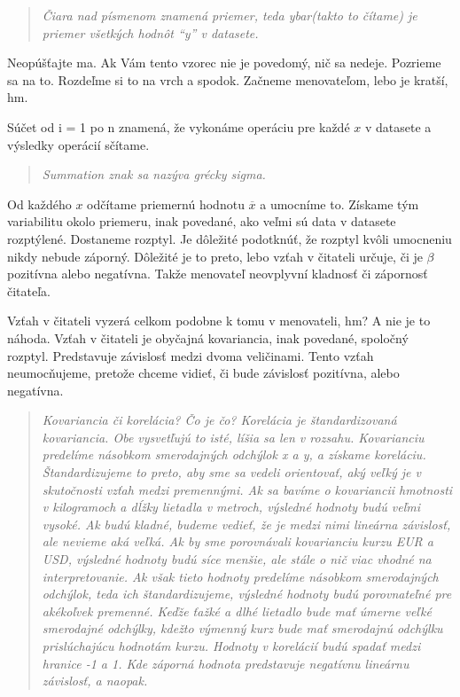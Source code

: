 \begin{quote}
\emph{Čiara nad písmenom znamená priemer, teda ybar(takto to čítame) je
priemer všetkých hodnôt ``y'' v datasete.}
\end{quote}

Neopúšťajte ma. Ak Vám tento vzorec nie je povedomý, nič sa nedeje.
Pozrieme sa na to. Rozdeľme si to na vrch a spodok. Začneme menovateľom,
lebo je kratší, hm.

Súčet od i = 1 po n znamená, že vykonáme operáciu pre každé \(x\) v
datasete a výsledky operácií sčítame.


\begin{quote}
\begin{center}
\emph{Summation znak sa nazýva grécky sigma.}
\end{center}
\end{quote}


Od každého \(x\) odčítame priemernú hodnotu \(\overline{x}\) a umocníme
to. Získame tým variabilitu okolo priemeru, inak povedané, ako veľmi sú
data v datasete rozptýlené. Dostaneme rozptyl. Je dôležité podotknúť, že
rozptyl kvôli umocneniu nikdy nebude záporný. Dôležité je to preto, lebo
vzťah v čitateli určuje, či je \(\beta\) pozitívna alebo negatívna.
Takže menovateľ neovplyvní kladnosť či zápornosť čitateľa.

Vzťah v čitateli vyzerá celkom podobne k tomu v menovateli, hm? A nie je
to náhoda. Vzťah v čitateli je obyčajná kovariancia, inak povedané,
spoločný rozptyl. Predstavuje závislosť medzi dvoma veličinami. Tento
vzťah neumocňujeme, pretože chceme vidieť, či bude závislosť pozitívna,
alebo negatívna.

\begin{quote}
\emph{Kovariancia či korelácia? Čo je čo? Korelácia je štandardizovaná
kovariancia. Obe vysvetľujú to isté, líšia sa len v rozsahu. Kovarianciu
predelíme násobkom smerodajných odchýlok x a y, a získame koreláciu.
Štandardizujeme to preto, aby sme sa vedeli orientovať, aký veľký je v
skutočnosti vzťah medzi premennými. Ak sa bavíme o kovariancii hmotnosti
v kilogramoch a dĺžky lietadla v metroch, výsledné hodnoty budú veľmi
vysoké. Ak budú kladné, budeme vedieť, že je medzi nimi lineárna
závislosť, ale nevieme aká veľká. Ak by sme porovnávali kovarianciu
kurzu EUR a USD, výsledné hodnoty budú síce menšie, ale stále o nič viac
vhodné na interpretovanie. Ak však tieto hodnoty predelíme násobkom
smerodajných odchýlok, teda ich štandardizujeme, výsledné hodnoty budú
porovnateľné pre akékoľvek premenné. Keďže ťažké a dlhé lietadlo bude
mať úmerne veľké smerodajné odchýlky, kdežto výmenný kurz bude mať
smerodajnú odchýlku prislúchajúcu hodnotám kurzu. Hodnoty v korelácií
budú spadať medzi hranice -1 a 1. Kde záporná hodnota predstavuje
negatívnu lineárnu závislosť, a naopak.}
\end{quote}

